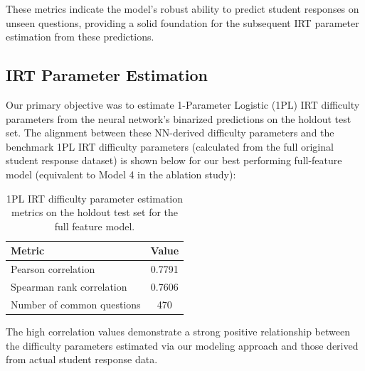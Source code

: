 \documentclass[
    a4paper, %
    10pt, %
    twoside, %
]{LTJournalArticle}
\begin{document}
These metrics indicate the model's robust ability to predict student responses on unseen questions, providing a solid foundation for the subsequent IRT parameter estimation from these predictions.

\subsection{IRT Parameter Estimation}

Our primary objective was to estimate 1-Parameter Logistic (1PL) IRT difficulty parameters from the neural network's binarized predictions on the holdout test set. The alignment between these NN-derived difficulty parameters and the benchmark 1PL IRT difficulty parameters (calculated from the full original student response dataset) is shown below for our best performing full-feature model (equivalent to Model 4 in the ablation study):

\begin{table}[H]
    \centering
    \begin{tabular}{lc}
        \hline
        \textbf{Metric} & \textbf{Value} \\
        \hline
        Pearson correlation & 0.7791 \\
        Spearman rank correlation & 0.7606 \\
        Number of common questions & 470 \\
        \hline
    \end{tabular}
    \caption{1PL IRT difficulty parameter estimation metrics on the holdout test set for the full feature model.}
    \label{tab:irt-metrics-1pl}
\end{table}

The high correlation values demonstrate a strong positive relationship between the difficulty parameters estimated via our modeling approach and those derived from actual student response data.
\end{document}
